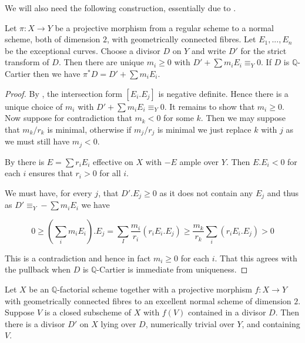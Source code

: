 	We will also need the following construction, essentially due to \cite{mumford1961topology}.
	
	\begin{lemma}
		
		Let $\pi:X \to Y$ be a projective morphism from a regular scheme to a normal scheme, both of dimension $2$, with geometrically connected fibres. Let $E_{1},...,E_{n}$ be the exceptional curves. Choose a divisor $D$ on $Y$ and write $D'$ for the strict transform of $D$. Then there are unique $m_{i} \geq 0$ with $D'+\sum m_{i}E_{i} \equiv_{Y} 0$. If $D$ is $\mathbb{Q}$-Cartier then we have $\pi^{*}D= D'+\sum m_{i}E_{i}$.
		
	\end{lemma}
	
	\begin{proof}
		
		By \cite[Theorem 10.1]{kk-singbook}, the intersection form $[E_{i}.E_{j}]$ is negative definite. Hence there is a unique choice of $m_{i}$ with $D'+\sum m_{i}E_{i} \equiv_{Y} 0$. It remains to show that $m_{i} \geq 0$. Now suppose for contradiction that $m_{k} < 0$ for some $k$. Then we may suppose that $m_{k}/r_{k}$ is minimal, otherwise if $m_{j}/r_{j}$ is minimal we just replace $k$ with $j$ as we must still have $m_{j} < 0$.
		
		By \cite[Lemma 10.2]{kk-singbook} there is $E= \sum r_{i}E_{i}$ effective on $X$ with $-E$ ample over $Y$. Then $E.E_{i} < 0$ for each $i$ ensures that $r_{i} > 0$ for all $i$.
				
		We must have, for every $j$, that $D'.E_{j}\geq 0 $ as it does not contain any $E_{j}$ and thus as $D' \equiv_{Y} - \sum m_{i}E_{i}$ we have
		
		\[0\geq (\sum_{i} m_{i} E_{i}).E_{j} = \sum_{I} \frac{m_{i}}{r_{i}}(r_{i}E_{i}.E_{j}) \geq \frac{m_{k}}{r_{k}} \sum_{i} (r_{i}E_{i}.E_{j}) > 0\]
		
		This is a contradiction and hence in fact $m_{i} \geq 0$ for each $i$. That this agrees with the pullback when $D$ is $\mathbb{Q}$-Cartier is immediate from uniqueness.
		
	\end{proof}
	
	\begin{lemma}\label{num-pull}
		
		Let $X$ be an $\mathbb{Q}$-factorial scheme together with a projective morphism $f:X \to Y$  with geometrically connected fibres to an excellent normal scheme of dimension $2$. Suppose $V$ is a closed subscheme of $X$ with $f(V)$ contained in a divisor $D$. Then there is a divisor $D'$ on $X$ lying over $D$, numerically trivial over $Y$, and containing $V$.
		
		\end{lemma}
	

